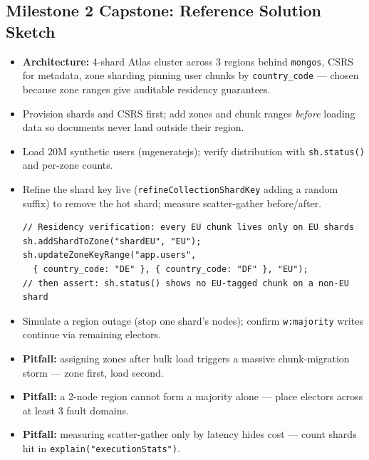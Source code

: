 \documentclass[11pt, a4paper]{article}
\begin{document}
\subsection*{Milestone 2 Capstone: Reference Solution Sketch}
\begin{itemize}[label=-, itemsep=0pt]
    \item \textbf{Architecture:} 4-shard Atlas cluster across 3 regions behind \texttt{mongos}, CSRS for metadata, zone sharding pinning user chunks by \texttt{country\_code} --- chosen because zone ranges give auditable residency guarantees.
    \item Provision shards and CSRS first; add zones and chunk ranges \emph{before} loading data so documents never land outside their region.
    \item Load 20M synthetic users (mgeneratejs); verify distribution with \texttt{sh.status()} and per-zone counts.
    \item Refine the shard key live (\texttt{refineCollectionShardKey} adding a random suffix) to remove the hot shard; measure scatter-gather before/after.
\begin{lstlisting}
// Residency verification: every EU chunk lives only on EU shards
sh.addShardToZone("shardEU", "EU");
sh.updateZoneKeyRange("app.users",
  { country_code: "DE" }, { country_code: "DF" }, "EU");
// then assert: sh.status() shows no EU-tagged chunk on a non-EU shard
\end{lstlisting}
    \item Simulate a region outage (stop one shard's nodes); confirm \texttt{w:majority} writes continue via remaining electors.
    \item \textbf{Pitfall:} assigning zones after bulk load triggers a massive chunk-migration storm --- zone first, load second.
    \item \textbf{Pitfall:} a 2-node region cannot form a majority alone --- place electors across at least 3 fault domains.
    \item \textbf{Pitfall:} measuring scatter-gather only by latency hides cost --- count shards hit in \texttt{explain("executionStats")}.
\end{itemize}
\end{document}
